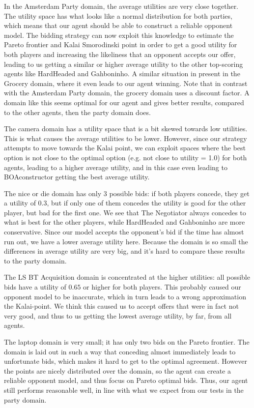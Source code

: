In the Amsterdam Party domain, the average utilities are very close together. The utility space has what looks like a normal distribution for both parties, which means that our agent should be able to construct a reliable opponent model. The bidding strategy can now exploit this knowledge to estimate the Pareto frontier and Kalai Smorodinski point in order to get a good utility for both players and increasing the likeliness that an opponent accepts our offer, leading to us getting a similar or higher average utility to the other top-scoring agents like HardHeaded and Gahboninho. A similar situation in present in the Grocery domain, where it even leads to our agent winning. Note that in contrast with the Amsterdam Party domain, the grocery domain uses a discount factor. A domain like this seems optimal for our agent and gives better results, compared to the other agents, then the party domain does.

The camera domain has a utility space that is a bit skewed towards low utilities. This is what causes the average utilities to be lower. However, since our strategy attempts to move towards the Kalai point, we can exploit spaces where the best option is not close to the optimal option (e.g. not close to utility = 1.0) for both agents, leading to a higher average utility, and in this case even leading to BOAconstructor getting the best average utility. 

The nice or die domain has only 3 possible bids: if both players concede, they get a utility of 0.3, but if only one of them concedes the utility is good for the other player, but bad for the first one. We see that The Negotiator always concedes to what is best for the other players, while HardHeaded and Gahboninho are more conservative. Since our model accepts the opponent's bid if the time has almost run out, we have a lower average utility here. Because the domain is so small the differences in average utility are very big, and it's hard to compare these results to the party domain.

The LS BT Acquisition domain is concentrated at the higher utilities: all possible bids have a utility of $0.65$ or higher for both players. This probably caused our opponent model to be inaccurate, which in turn leads to a wrong approximation the Kalai-point. We think this caused us to accept offers that were in fact not very good, and thus to us getting the lowest average utility, by far, from all agents.

The laptop domain is very small; it has only two bids on the Pareto frontier. The domain is laid out in such a way that conceding almost immediately leads to unfortunate bids, which makes it hard to get to the optimal agreement. However the points are nicely distributed over the domain, so the agent can create a reliable opponent model, and thus focus on Pareto optimal bids. Thus, our agent still performs reasonable well, in line with what we expect from our tests in the party domain.


